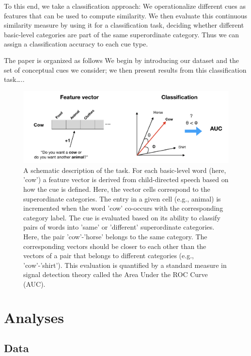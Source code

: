 \documentclass[english,,man,floatsintext]{apa6}
\begin{document}
To this end, we take a classification approach: We operationalize different cues as features that can be used to compute similarity. We then evaluate this continuous similarity measure by using it for a classification task, deciding whether different basic-level
categories are part of the same superordinate category. Thus we can assign a classification accuracy to each cue type.

The paper is organized as follows We begin by introducing our dataset and the set of conceptual cues we consider; we then present results from this classification task\ldots{}..

\begin{figure}[h]

{\centering \includegraphics{cogsci_journal_files/figure-latex/task-1} 

}

\caption{\label{fig:task} A schematic description of the task. For each basic-level word (here, 'cow') a feature vector is derived from child-directed speech based on how the cue is defined. Here, the vector cells correspond to the superordinate categories. The entry in a given cell (e.g., animal) is incremented when the word 'cow' co-occurs with the corresponding category label. The cue is evaluated based on its ability to classify pairs of words into 'same' or 'different' superordinate categories. Here, the pair 'cow'-'horse' belongs to the same category. The corresponding vectors should be closer to each other than the vectors of a pair that belongs to different categories (e.g., 'cow'-'shirt'). This evaluation is quantified by a standard measure in signal detection theory called the Area Under the ROC Curve (AUC).}\label{fig:task}
\end{figure}

\hypertarget{analyses}{%
\section{Analyses}\label{analyses}}

\hypertarget{data}{%
\subsection{Data}\label{data}}
\end{document}
